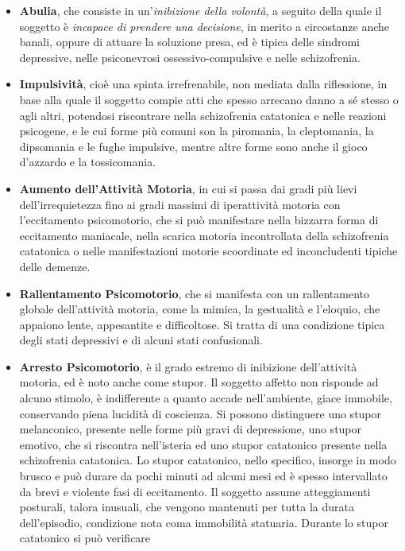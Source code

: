 \documentclass[]{article}
\begin{document}
\begin{itemize}
\item
  \textbf{Abulia}, che consiste in un'\emph{inibizione della volontà}, a
  seguito della quale il soggetto è \emph{incapace di prendere una
  decisione}, in merito a circostanze anche banali, oppure di attuare la
  soluzione presa, ed è tipica delle sindromi depressive, nelle
  psiconevrosi ossessivo-compulsive e nelle schizofrenia.
\item
  \textbf{Impulsività}, cioè una spinta irrefrenabile, non mediata dalla
  riflessione, in base alla quale il soggetto compie atti che spesso
  arrecano danno a sé stesso o agli altri, potendosi riscontrare nella
  schizofrenia catatonica e nelle reazioni psicogene, e le cui forme più
  comuni son la piromania, la cleptomania, la dipsomania e le fughe
  impulsive, mentre altre forme sono anche il gioco d'azzardo e la
  tossicomania.
\item
  \textbf{Aumento dell'Attività Motoria}, in cui si passa dai gradi più
  lievi dell'irrequietezza fino ai gradi massimi di iperattività motoria
  con l'eccitamento psicomotorio, che si può manifestare nella bizzarra
  forma di eccitamento maniacale, nella scarica motoria incontrollata
  della schizofrenia catatonica o nelle manifestazioni motorie
  scoordinate ed inconcludenti tipiche delle demenze.
\item
  \textbf{Rallentamento Psicomotorio}, che si manifesta con un
  rallentamento globale dell'attività motoria, come la mimica, la
  gestualità e l'eloquio, che appaiono lente, appesantite e
  difficoltose. Si tratta di una condizione tipica degli stati
  depressivi e di alcuni stati confusionali.
\item
  \textbf{Arresto Psicomotorio}, è il grado estremo di inibizione
  dell'attività motoria, ed è noto anche come stupor. Il soggetto
  affetto non risponde ad alcuno stimolo, è indifferente a quanto accade
  nell'ambiente, giace immobile, conservando piena lucidità di
  coscienza. Si possono distinguere uno stupor melanconico, presente
  nelle forme più gravi di depressione, uno stupor emotivo, che si
  riscontra nell'isteria ed uno stupor catatonico presente nella
  schizofrenia catatonica. Lo stupor catatonico, nello specifico,
  insorge in modo brusco e può durare da pochi minuti ad alcuni mesi ed
  è spesso intervallato da brevi e violente fasi di eccitamento. Il
  soggetto assume atteggiamenti posturali, talora inusuali, che vengono
  mantenuti per tutta la durata dell'episodio, condizione nota coma
  immobilità statuaria. Durante lo stupor catatonico si può verificare

\end{itemize}
\end{document}
